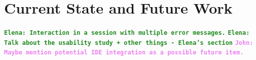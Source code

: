 \documentclass[12pt]{article}
\newcommand{\comment}[1]{{\bf \tt  {#1}}}
\newcommand{\emcomment}[1]{\textcolor{ForestGreen}{\comment{Elena: {#1}}}}
\newcommand{\jwcomment}[1]{\textcolor{violet}{\comment{John: {#1}}}}
\begin{document}
\section{Current State and Future Work}\label{sec:future}
	\emcomment{Interaction in a session with multiple error messages.}
	\emcomment{Talk about the usability study + other things - Elena's section}
	\jwcomment{Maybe mention potential IDE integration as a possible future item.}



\end{document}
